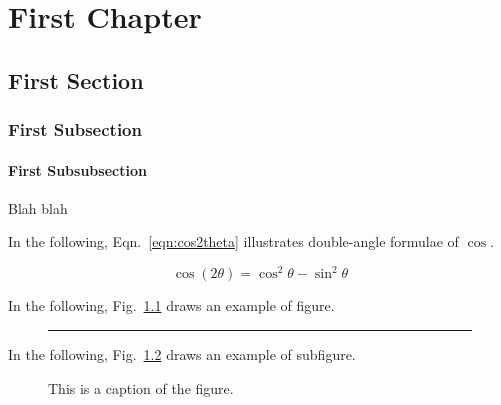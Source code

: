 \documentclass[11pt]{book}
\begin{document}
\pagestyle{plain} %

\tableofcontents
\listoffigures
\listoftables

\clearpage

\chapter{First Chapter}

\setcounter{page}{1}

\section{First Section}

\subsection{First Subsection}

\subsubsection{First Subsubsection}

Blah blah

In the following, Eqn.~\ref{eqn:cos2theta} illustrates double-angle formulae of $\cos$. %

\begin{equation}
\label{eqn:cos2theta}
\cos (2\theta) = \cos^2 \theta - \sin^2 \theta
\end{equation}

\newpage

In the following, Fig.~\ref{fig:dum1} draws an example of figure.
\begin{figure}[ht]
\begin{center}
\rule{0.5\linewidth}{0.35\linewidth}
\caption[Long caption figure]{\blindtext}
\label{fig:dum1}
\end{center}
\end{figure}

In the following, Fig.~\ref{fig:subfig} draws an example of subfigure.
\begin{figure}[ht]
\caption{This is a caption of the figure.}
\label{fig:subfig}
\end{figure}
\end{document}
